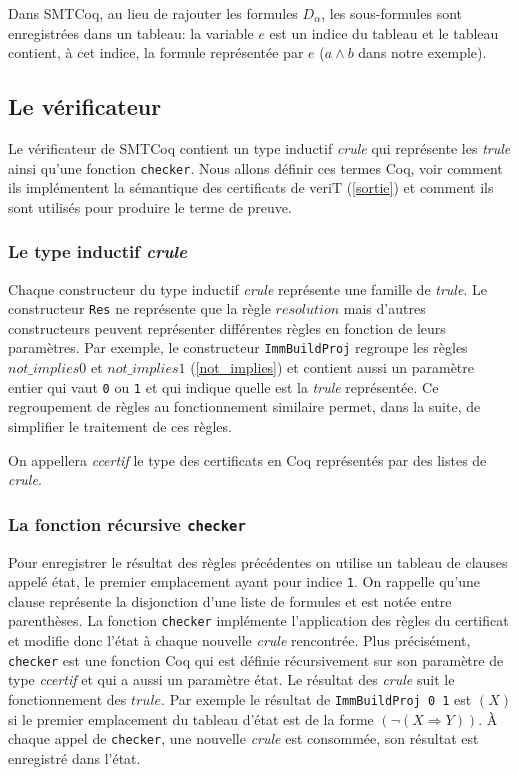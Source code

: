 \documentclass[11pt]{article}
\begin{document}
Dans SMTCoq, au lieu de rajouter les formules $D_\alpha$, les sous-formules sont enregistrées dans un tableau: la variable $e$ est un indice du tableau et le tableau contient, à cet indice, la formule représentée par $e$ ($a \wedge b$ dans notre exemple).

\subsection{Le vérificateur}

Le vérificateur de SMTCoq contient un type inductif \textit{crule} qui représente les \textit{trule} ainsi qu'une fonction \texttt{checker}. Nous allons définir ces termes Coq, voir comment ils implémentent la sémantique des certificats de veriT (\ref{sortie}) et comment ils sont utilisés pour produire le terme de preuve.


\subsubsection{Le type inductif \textit{crule}}\label{regroupement}


Chaque constructeur du type inductif \textit{crule} représente une famille de  \textit{trule}. Le constructeur \texttt{Res} ne représente que la règle $resolution$ mais d'autres constructeurs peuvent représenter différentes règles en fonction de leurs paramètres. Par exemple, le constructeur \texttt{ImmBuildProj} regroupe les règles $not\_implies0$ et $not\_implies1$ (\ref{not_implies}) et contient aussi un paramètre entier qui vaut \texttt{0} ou \texttt{1} et qui indique quelle est la \textit{trule} représentée. Ce regroupement de règles au fonctionnement similaire permet, dans la suite, de simplifier le traitement de ces règles. \medbreak

On appellera \textit{ccertif} le type des certificats en Coq représentés par des listes de \textit{crule}.


\subsubsection{La fonction récursive \texttt{checker}} \label{checker}

Pour enregistrer le résultat des règles précédentes on utilise un tableau de clauses appelé état, le premier emplacement ayant pour indice \texttt{1}. On rappelle qu'une clause représente la disjonction d'une liste de formules et est notée  entre parenthèses. La fonction \texttt{checker} implémente l'application des règles du certificat et modifie donc l'état à chaque nouvelle \textit{crule} rencontrée. Plus précisément, \texttt{checker} est une fonction Coq qui est définie récursivement sur son paramètre de type \textit{ccertif} et qui a aussi un paramètre état. Le résultat des \textit{crule} suit le fonctionnement des $trule$. Par exemple le résultat de \texttt{ImmBuildProj 0 1} est $(X)$ si le premier emplacement du tableau d'état est de la forme $(\neg (X \Rightarrow Y))$. À chaque appel de \texttt{checker}, une nouvelle \textit{crule} est consommée, son résultat est enregistré dans l'état.\medbreak
\end{document}
